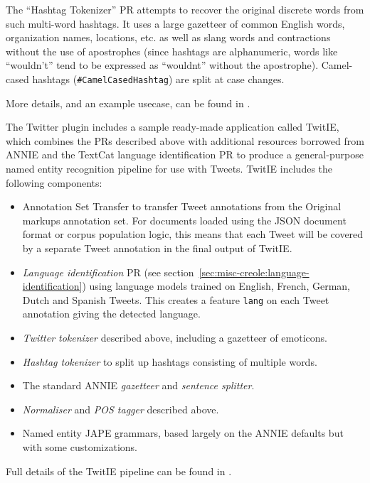 The ``Hashtag Tokenizer'' PR attempts to recover the original discrete words
from such multi-word hashtags.  It uses a large gazetteer of common English
words, organization names, locations, etc. as well as slang words and
contractions without the use of apostrophes (since hashtags are alphanumeric,
words like ``wouldn't'' tend to be expressed as ``wouldnt'' without the
apostrophe).  Camel-cased hashtags (\verb!#CamelCasedHashtag!) are split at
case changes.

More details, and an example usecase, can be found in \cite{Maynard14a}.


The Twitter plugin includes a sample ready-made application called TwitIE,
which combines the PRs described above with additional resources borrowed from
ANNIE and the TextCat language identification PR to produce a general-purpose
named entity recognition pipeline for use with Tweets.  TwitIE includes the
following components:

\begin{itemize}
\item Annotation Set Transfer to transfer Tweet annotations from the Original
  markups annotation set.  For documents loaded using the JSON document format
  or corpus population logic, this means that each Tweet will be covered by a
  separate Tweet annotation in the final output of TwitIE.
\item \emph{Language identification} PR (see
  section~\ref{sec:misc-creole:language-identification}) using language models
  trained on English, French, German, Dutch and Spanish Tweets.  This creates a
  feature \verb!lang! on each Tweet annotation giving the detected language.
\item \emph{Twitter tokenizer} described above, including a gazetteer of
  emoticons.
\item \emph{Hashtag tokenizer} to split up hashtags consisting of multiple
  words.
\item The standard ANNIE \emph{gazetteer} and \emph{sentence splitter}.
\item \emph{Normaliser} and \emph{POS tagger} described above.
\item Named entity JAPE grammars, based largely on the ANNIE defaults but with
  some customizations.
\end{itemize}

Full details of the TwitIE pipeline can be found in \cite{bontcheva2013twitie}.


